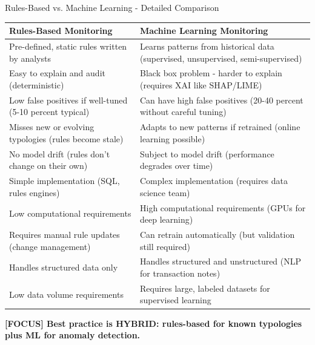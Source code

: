\documentclass[11pt,a4paper]{beamer}
\newcommand{\examfocus}[1]{\textcolor{orange!80!black}{\textbf{[FOCUS] #1}}}
\begin{document}
	\begin{frame}{Rules-Based vs. Machine Learning - Detailed Comparison}
		\begin{longtable}{p{}|p{}}
			\hline
			\rowcolor{lightgray}
			\textbf{Rules-Based Monitoring} & \textbf{Machine Learning Monitoring} \\
			\hline
			Pre-defined, static rules written by analysts & Learns patterns from historical data (supervised, unsupervised, semi-supervised) \\
			\hline
			Easy to explain and audit (deterministic) & Black box problem - harder to explain (requires XAI like SHAP/LIME) \\
			\hline
			Low false positives if well-tuned (5-10 percent typical) & Can have high false positives (20-40 percent without careful tuning) \\
			\hline
			Misses new or evolving typologies (rules become stale) & Adapts to new patterns if retrained (online learning possible) \\
			\hline
			No model drift (rules don't change on their own) & Subject to model drift (performance degrades over time) \\
			\hline
			Simple implementation (SQL, rules engines) & Complex implementation (requires data science team) \\
			\hline
			Low computational requirements & High computational requirements (GPUs for deep learning) \\
			\hline
			Requires manual rule updates (change management) & Can retrain automatically (but validation still required) \\
			\hline
			Handles structured data only & Handles structured and unstructured (NLP for transaction notes) \\
			\hline
			Low data volume requirements & Requires large, labeled datasets for supervised learning \\
			\hline
		\end{longtable}
		
		\examfocus{Best practice is HYBRID: rules-based for known typologies plus ML for anomaly detection.}
	\end{frame}
	
\end{document}
